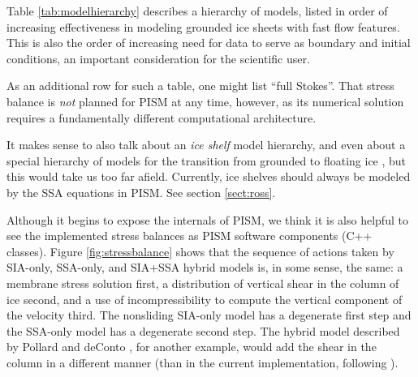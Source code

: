 \documentclass[titlepage,letterpaper,final]{scrartcl}
\begin{document}
Table \ref{tab:modelhierarchy} describes a hierarchy of models, listed in order of increasing effectiveness in modeling grounded ice sheets with fast flow features.  This is also the order of increasing need for data to serve as boundary and initial conditions, an important consideration for the scientific user.

As an additional row for such a table, one might list ``full Stokes''.  That stress balance is \emph{not} planned for PISM at any time, however, as its numerical solution requires a fundamentally different computational architecture.

It makes sense to also talk about an \emph{ice shelf} model hierarchy, and even about a special hierarchy of models for the transition from grounded to floating ice \cite{SchoofMarine1}, but this would take us too far afield.  Currently, ice shelves should always be modeled by the SSA equations in PISM.  See section \ref{sect:ross}.

Although it begins to expose the internals of PISM, we think it is also helpful to see the implemented stress balances as PISM software components (C++ classes).  Figure \ref{fig:stressbalance} shows that the sequence of actions taken by SIA-only, SSA-only, and SIA+SSA hybrid models is, in some sense, the same: a membrane stress solution first, a distribution of vertical shear in the column of ice second, and a use of incompressibility to compute the vertical component of the velocity third.  The nonsliding SIA-only model has a degenerate first step and the SSA-only model has a degenerate second step.  The hybrid model described by Pollard and deConto \cite{PollardDeConto}, for another example, would add the shear in the column in a different manner (than in the current implementation, following \cite{BBssasliding,Winkelmannetal2010TCD}).

\newenvironment{tightlist}{\begin{itemize}  \vspace{-0.15in}\addtolength{\itemsep}{-0.5\baselineskip} } {\vspace{-0.1in} \end{itemize}}

\newcommand{\nolist}[1]{[\emph{#1}] \vspace{0.1in}}
\end{document}
